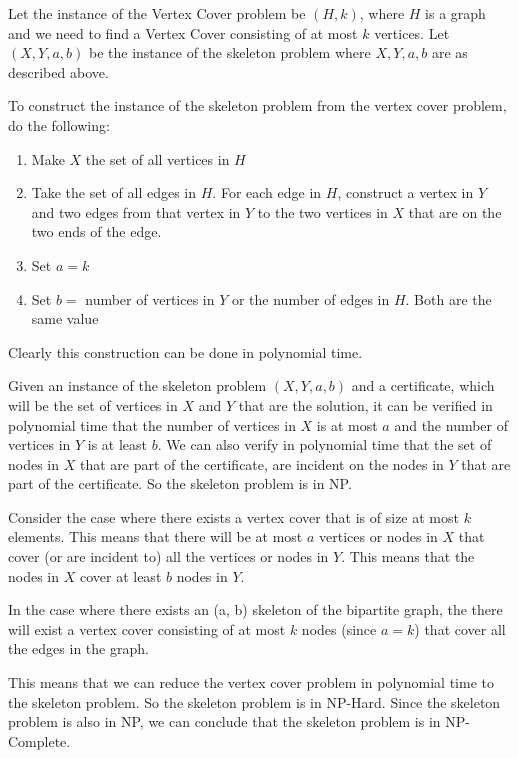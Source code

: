 \documentclass[paper=a4, fontsize=11pt]{scrartcl} %
\numberwithin{figure}{section} %
\numberwithin{table}{section} %
\begin{document}
\begin{enumerate}
Let the instance of the Vertex Cover problem be $(H, k)$, where $H$ is a graph and we need to find a Vertex Cover consisting of at most $k$ vertices. Let $(X, Y, a, b)$ be the instance of the skeleton problem where $X, Y, a, b$ are as described above. 

To construct the instance of the skeleton problem from the vertex cover problem, do the following:

\begin{enumerate}

\item Make $X$ the set of all vertices in $H$

\item Take the set of all edges in $H$. For each edge in $H$, construct a vertex in $Y$ and two edges from that vertex in $Y$ to the two vertices in $X$ that are on the two ends of the edge.

\item Set $a = k$

\item Set $b =$ number of vertices in $Y$ or the number of edges in $H$. Both are the same value

\end{enumerate}

Clearly this construction can be done in polynomial time. 

Given an instance of the skeleton problem $(X, Y, a, b)$ and a certificate, which will be the set of vertices in $X$ and $Y$ that are the solution, it can be verified in polynomial time that the number of vertices in $X$ is at most $a$ and the number of vertices in $Y$ is at least $b$. We can also verify in polynomial time that the set of nodes in $X$ that are part of the certificate, are incident on the nodes in $Y$ that are part of the certificate. So the skeleton problem is in NP.

Consider the case where there exists a vertex cover that is of size at most $k$ elements. This means that there will be at most $a$ vertices or nodes in $X$ that cover (or are incident to) all the vertices or nodes in $Y$. This means that the nodes in $X$ cover at least $b$ nodes in $Y$.

In the case where there exists an (a, b) skeleton of the bipartite graph, the there will exist a vertex cover consisting of at most $k$ nodes (since $a=k$) that cover all the edges in the graph.

This means that we can reduce the vertex cover problem in polynomial time to the skeleton problem. So the skeleton problem is in NP-Hard. Since the skeleton problem is also in NP, we can conclude that the skeleton problem is in NP-Complete.


\end{enumerate}
\end{document}
